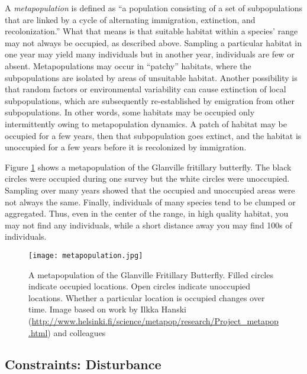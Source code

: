\documentclass[12pt, oneside]{article}   	%
\begin{document}
A \emph{metapopulation} is defined as ``a population consisting of a set of subpopulations that are linked by a cycle of alternating immigration, extinction, and recolonization.''  What that means is that suitable habitat within a species' range may not always be occupied, as described above.  Sampling a particular habitat in one year may yield many individuals but in another year, individuals are few or absent.  Metapopulations may occur in ``patchy'' habitats, where the subpopulations are isolated by areas of unsuitable habitat.  Another possibility is that random factors or environmental variability can cause extinction of local subpopulations, which are subsequently re-established by emigration from other subpopulations. In other words, some habitats may be occupied only intermittently owing to metapopulation dynamics. A patch of habitat may be occupied for a few years, then that subpopulation goes extinct, and the habitat is unoccupied for a few years before it is recolonized by immigration. 

Figure \ref{metapop} shows a metapopulation of the Glanville fritillary butterfly.  The black circles were occupied during one survey but the white circles were unoccupied.  Sampling over many years showed that the occupied and unoccupied areas were not always the same.  Finally, individuals of many species tend to be clumped or aggregated.  Thus, even in the center of the range, in high quality habitat, you may not find any individuals, while a short distance away you may find 100s of individuals.

\begin{figure}[hb]
	\centering
	\texttt{[image: metapopulation.jpg]}
	\caption{A metapopulation of the Glanville Fritillary Butterfly. Filled circles indicate occupied locations. Open circles indicate unoccupied locations. Whether a particular location is occupied changes over time. Image based on work by Ilkka Hanski (\url{http://www.helsinki.fi/science/metapop/research/Project_metapop.html}) and colleagues \label{metapop}}
\end{figure}

\subsection{Constraints: Disturbance}
\end{document}
